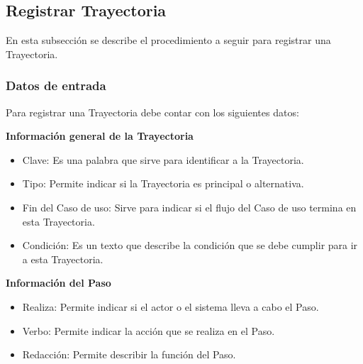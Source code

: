 \subsection{Registrar Trayectoria}
En esta subsección se describe el procedimiento a seguir para registrar una Trayectoria.

\subsubsection{Datos de entrada}
\begin{description}
	\item Para registrar una Trayectoria debe contar con los siguientes datos: \hspace{10pt}
	
	\begin{description}
	    \item \textbf{Información general de la Trayectoria}
	    \begin{itemize}
		  \item Clave: Es una palabra que sirve para identificar a la Trayectoria.
		  \item Tipo: Permite indicar si la Trayectoria es principal o alternativa.
		  \item Fin del Caso de uso: Sirve para indicar si el flujo del Caso de uso termina en esta Trayectoria.
		  \item Condición: Es un texto que describe la condición que se debe cumplir para ir a esta Trayectoria.
	    \end{itemize}
	    \item \textbf{Información del Paso}
	    \begin{itemize}
		  \item Realiza: Permite indicar si el actor o el sistema lleva a cabo el Paso.
		  \item Verbo: Permite indicar la acción que se realiza en el Paso.
		  \item Redacción: Permite describir la función del Paso.
	    \end{itemize}
	 \end{description}
\end{description}

